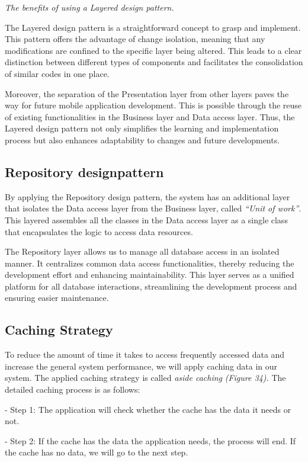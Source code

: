 \emph{The benefits of using a Layered design pattern.}

The Layered design pattern is a straightforward concept to grasp and
implement. This pattern offers the advantage of change isolation,
meaning that any modifications are confined to the specific layer being
altered. This leads to a clear distinction between different types of
components and facilitates the consolidation of similar codes in one
place.

Moreover, the separation of the Presentation layer from other layers
paves the way for future mobile application development. This is
possible through the reuse of existing functionalities in the Business
layer and Data access layer. Thus, the Layered design pattern not only
simplifies the learning and implementation process but also enhances
adaptability to changes and future developments.


\subsection{Repository designpattern}

By applying the Repository design pattern, the system has an additional
layer that isolates the Data access layer from the Business layer,
called \emph{``Unit of work''}. This layered assembles all the classes
in the Data access layer as a single class that encapsulates the logic
to access data resources.

The Repository layer allows us to manage all database access in an
isolated manner. It centralizes common data access functionalities,
thereby reducing the development effort and enhancing maintainability.
This layer serves as a unified platform for all database interactions,
streamlining the development process and ensuring easier maintenance.


\subsection{Caching Strategy}


To reduce the amount of time it takes to access frequently accessed data
and increase the general system performance, we will apply caching data
in our system. The applied caching strategy is called \emph{aside
    caching} \emph{(Figure 34).} The detailed caching process is as follows:

- Step 1: The application will check whether the cache has the data it
needs or not.

- Step 2: If the cache has the data the application needs, the process
will end. If the cache has no data, we will go to the next step.

